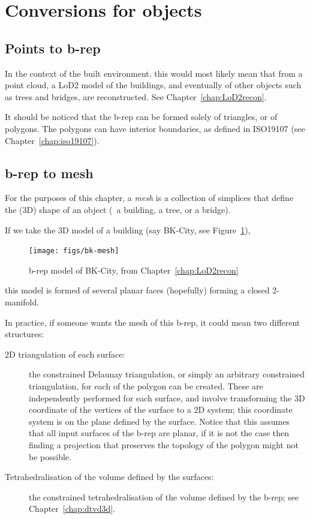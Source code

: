 %
\section{Conversions for objects}


\subsection{Points to b-rep}

In the context of the built environment, this would most likely mean that from a point cloud, a LoD2 model of the buildings, and eventually of other objects such as trees and bridges, are reconstructed. See Chapter~\ref{chap:LoD2recon}.

It should be noticed that the b-rep can be formed solely of triangles, or of polygons.
The polygons can have interior boundaries, as defined in ISO19107 (see Chapter~\ref{chap:iso19107}).


\subsection{b-rep to mesh}

For the purposes of this chapter, a \emph{mesh} is a collection of simplices that define the (3D) shape of an object (\eg\ a building, a tree, or a bridge).

If we take the 3D model of a building (say BK-City, see Figure~\ref{fig:bk-mesh}), 
\begin{figure}
  \centering
  \texttt{[image: figs/bk-mesh]}
  \caption{b-rep model of BK-City, from Chapter~\ref{chap:LoD2recon}}%
\label{fig:bk-mesh}
\end{figure}
this model is formed of several planar faces (hopefully) forming a closed 2-manifold.

In practice, if someone wants the mesh of this b-rep, it could mean two different structures:
\begin{description}
  \item[2D triangulation of each surface:] the constrained Delaunay triangulation, or simply an arbitrary constrained triangulation, for each of the polygon can be created. These are independently performed for each surface, and involve transforming the 3D coordinate of the vertices of the surface to a 2D system; this coordinate system is on the plane defined by the surface. Notice that this assumes that all input surfaces of the b-rep are planar, if it is not the case then finding a projection that preserves the topology of the polygon might not be possible.
  \item[Tetrahedralisation of the volume defined by the surfaces:] the constrained tetrahedralisation of the volume defined by the b-rep; see Chapter~\ref{chap:dtvd3d}.
\end{description}

